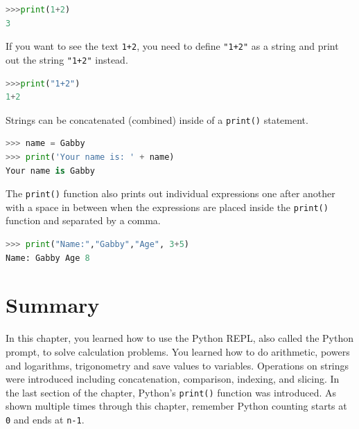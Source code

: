 \documentclass{book}
\begin{document}
\begin{lstlisting}[language=Python]
>>>print(1+2)
3
\end{lstlisting}

If you want to see the text \lstinline!1+2!, you need to define
\lstinline!"1+2"! as a string and print out the string \lstinline!"1+2"!
instead.

\begin{lstlisting}[language=Python]
>>>print("1+2")
1+2
\end{lstlisting}
    




    
        Strings can be concatenated (combined) inside of a \lstinline!print()!
statement.

\begin{lstlisting}[language=Python]
>>> name = Gabby
>>> print('Your name is: ' + name)
Your name is Gabby
\end{lstlisting}
    




    
        The \lstinline!print()! function also prints out individual expressions
one after another with a space in between when the expressions are
placed inside the \lstinline!print()! function and separated by a comma.

\begin{lstlisting}[language=Python]
>>> print("Name:","Gabby","Age", 3+5)
Name: Gabby Age 8
\end{lstlisting}
    




    
        \newpage
        \section{Summary}\label{summary}

    




    
        In this chapter, you learned how to use the Python REPL, also called the
Python prompt, to solve calculation problems. You learned how to do
arithmetic, powers and logarithms, trigonometry and save values to
variables. Operations on strings were introduced including
concatenation, comparison, indexing, and slicing. In the last section of
the chapter, Python's \lstinline!print()! function was introduced. As
shown multiple times through this chapter, remember Python counting
starts at \lstinline!0! and ends at \lstinline!n-1!.
    
\end{document}
